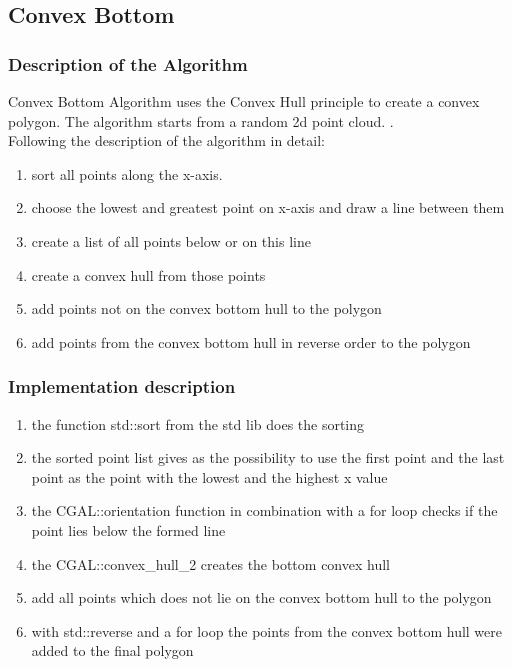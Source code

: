 \subsection{Convex Bottom}
\subsubsection{Description of the Algorithm}
Convex Bottom Algorithm uses the Convex Hull principle to create a convex
polygon. The algorithm starts from a random 2d point cloud.
.
\\[12pt]
Following the description of the algorithm in detail:

\begin{enumerate}
  \item sort all points along the x-axis.
  \item choose the lowest and greatest point on x-axis and draw a line between them
  \item create a list of all points below or on this line 
  \item create a convex hull from those points 
  \item add points not on the convex bottom hull to the polygon 
  \item add points from the convex bottom hull in reverse order to the polygon
\end{enumerate}

\subsubsection{Implementation description}
\begin{enumerate}
  \item the function std::sort from the std lib does the sorting
  \item the sorted point list gives as the possibility to use the first point
    and the last point as the point with the lowest and the highest x value
  \item the CGAL::orientation function in combination with a for loop checks if
    the point lies below the formed line
  \item the CGAL::convex\_hull\_2 creates the bottom convex hull
  \item add all points which does not lie on the convex bottom hull to the polygon
  \item with std::reverse and a for loop the points from the convex bottom hull
    were added to the final polygon
\end{enumerate}


